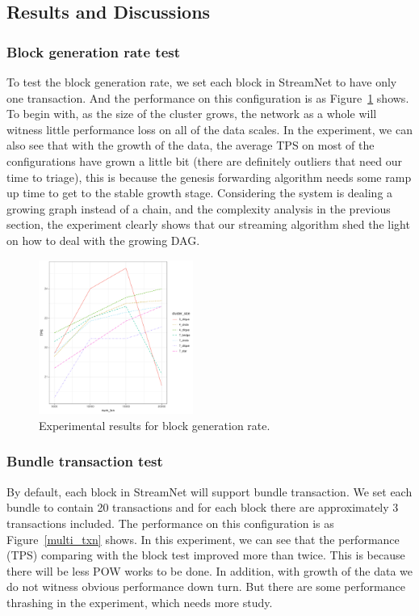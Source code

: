 \subsection {Results and Discussions}

\subsubsection {Block generation rate test}
To test the block generation rate, we set each block in StreamNet to have only one transaction.
And the performance on this configuration is as Figure~\ref{single_txn} shows.
To begin with, as the size of the cluster grows, the network as a whole will witness little performance loss on all of the data scales. 
In the experiment, we can also see that with the growth of the data, the average TPS on most of the configurations have grown a little bit (there are definitely outliers that need our time to triage), 
this is because the genesis forwarding algorithm needs some ramp up time to get to the stable growth stage. 
Considering the system is dealing a growing graph instead of a chain, and the complexity analysis in the previous section,
the experiment clearly shows that our streaming algorithm shed the light on how to deal with the growing DAG.

\begin{figure}[!ht]
\begin{center}
\includegraphics[height=0.35\textwidth, width=0.45\textwidth]{figures/single_txn.pdf}
    \caption{
        Experimental results for block generation rate.
     }
\label{single_txn}
\end{center}
\end{figure}



\subsubsection {Bundle transaction test}

By default, each block in StreamNet will support bundle transaction. 
We set each bundle to contain 20 transactions and for each block there are approximately 3 transactions included.
The performance on this configuration is as Figure~\ref{multi_txn} shows.
In this experiment, we can see that the performance (TPS) comparing with the block test improved more than twice. 
This is because there will be less POW works to be done.
In addition, with growth of the data we do not witness obvious performance down turn. But there are some performance thrashing in the experiment, which needs more study. 

